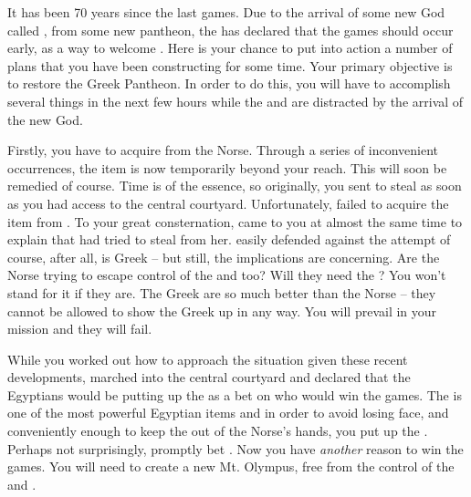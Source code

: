 \documentclass[char]{guardians}
\begin{document}
It has been 70 years since the last games.  Due to the arrival of some new God called \cUnity{}, from some new pantheon, the \cCaretaker{} has declared that the games should occur early, as a way to welcome \cUnity{\them}. Here is your chance to put into action a number of plans that you have been constructing for some time. Your primary objective is to restore the Greek Pantheon. In order to do this, you will have to accomplish several things in the next few hours while the \cCaretaker{} and \cWarden{} are distracted by the arrival of the new God.


Firstly, you have to acquire \iHammer{\MYname} from the Norse. Through a series of inconvenient occurrences, the item is now temporarily beyond your reach. This will soon be remedied of course. Time is of the essence, so originally, you sent \cPandora{} to steal \iHammer{\MYname} as soon as you had access to the central courtyard. Unfortunately, \cPandora{\they} failed to acquire the item from \cHel{}. To your great consternation, \cHera{} came to you at almost the same time to explain that \cVal{} had tried to steal \iSandals{\MYname} from her. \cHera{} easily defended against the attempt of course, after all, \cHera{\they} is Greek -- but still, the implications are concerning. Are the Norse trying to escape control of the \cCaretaker{} and \cWarden{} too? Will they need the \stone? You won't stand for it if they are. The Greek are so much better than the Norse -- they cannot be allowed to show the Greek up in any way. You will prevail in your mission and they will fail.

While you worked out how to approach the situation given these recent developments, \cOsiris{} marched into the central courtyard and declared that the Egyptians would be putting up the \iNecro{\MYname} as a bet on who would win the games. The \iNecro{\MYname} is one of the most powerful Egyptian items and in order to avoid losing face, and conveniently enough to keep the \iSandals{\MYname} out of the Norse's hands, you put up the \iSandals{\MYname}. Perhaps not surprisingly, \cOdin{} promptly bet \iHammer{\MYname}. Now you have \emph{another} reason to win the games. You will need \iHammer{\MYname} to create a new Mt. Olympus, free from the control of the \cCaretaker{} and \cWarden{}.
\end{document}
